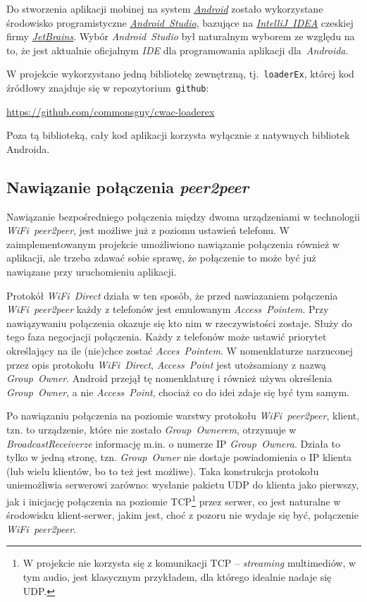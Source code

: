 \documentclass[a4paper,titlepage]{article}
\theoremstyle{break}
\begin{document}
Do stworzenia aplikacji mobinej na system \emph{\href{http://www.android.com/}{Android}} zostało wykorzystane środowisko programistyczne \href{http://developer.android.com/tools/studio/index.html}{\emph{Android~Studio}}, bazujące na \emph{\href{https://www.jetbrains.com/idea/}{IntelliJ~IDEA}} czeskiej firmy \emph{\href{https://www.jetbrains.com/}{JetBrains}}. Wybór \emph{Android~Studio} był naturalnym wyborem ze względu na to, że jest aktualnie oficjalnym \emph{IDE} dla programowania aplikacji dla~\emph{Androida}.

W projekcie wykorzystano jedną bibliotekę zewnętrzną, tj.~\texttt{loaderEx}, której kod źródłowy znajduje się w repozytorium~\texttt{github}:
\begin{center}
\url{https://github.com/commonsguy/cwac-loaderex}
\end{center}
Poza tą biblioteką, cały kod aplikacji korzysta wyłącznie z natywnych bibliotek Androida.


\subsection{Nawiązanie połączenia \emph{peer2peer}}

Nawiązanie bezpośredniego połączenia między dwoma urządzeniami w technologii \emph{WiFi~peer2peer}, jest możliwe już z poziomu ustawień telefonu. W zaimplementowanym projekcie umożliwiono nawiązanie połączenia również w aplikacji, ale trzeba zdawać sobie sprawę, że połączenie to może być już nawiązane przy uruchomieniu aplikacji.

Protokół \emph{WiFi~Direct} działa w ten sposób, że przed nawiazaniem połączenia \emph{WiFi~peer2peer} każdy z telefonów jest emulowanym \emph{Access~Pointem}. Przy nawiązywaniu połączenia okazuje się kto nim w rzeczywistości zostaje. Służy do tego faza negocjacji połączenia. Każdy z telefonów może ustawić priorytet określający na ile (nie)chce zostać \emph{Acces~Pointem}. W nomenklaturze narzuconej przez opis protokołu \emph{WiFi~Direct}, \emph{Access~Point} jest utożsamiany z nazwą \emph{Group~Owner}. Android przejął tę nomenklaturę i również używa określenia \emph{Group~Owner}, a nie \emph{Access~Point}, chociaż co do idei zdaje się być tym samym.

Po nawiązaniu połączenia na poziomie warstwy protokołu \emph{WiFi~peer2peer}, klient, tzn. to urządzenie, które nie zostało \emph{Group~Ownerem}, otrzymuje w \emph{BroadcastReceiverze} informację m.in. o numerze IP \emph{Group~Ownera}. Działa to tylko w jedną stronę, tzn. \emph{Group~Owner} nie dostaje powiadomienia o IP klienta (lub wielu klientów, bo to też jest możliwe). Taka konstrukcja protokołu uniemożliwia serwerowi zarówno: wysłanie pakietu UDP do klienta jako pierwszy, jak i inicjację połączenia na poziomie TCP\footnote{W projekcie nie korzysta się z komunikacji TCP -- \emph{streaming} multimediów, w tym audio, jest klasycznym przykładem, dla którego idealnie nadaje się UDP.} przez serwer, co jest naturalne w środowisku klient-serwer, jakim jest, choć z pozoru nie wydaje się być, połączenie \emph{WiFi~peer2peer}.
\end{document}
